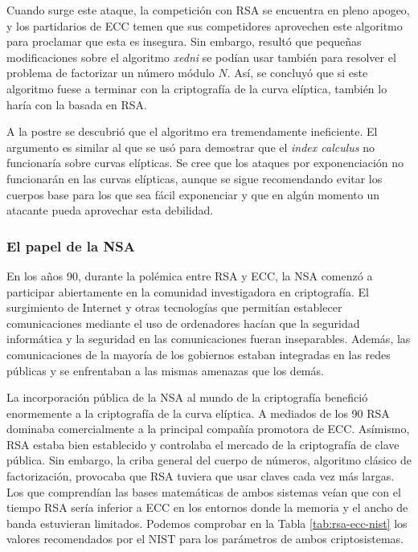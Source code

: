 \documentclass[
  a4paper,
  12pt,
  spanish,
]{scrartcl}
\begin{document}
Cuando surge este ataque, la competición con RSA se encuentra en pleno apogeo, y los partidarios de ECC temen que sus competidores aprovechen este algoritmo para proclamar que esta es insegura. Sin embargo, resultó que pequeñas modificaciones sobre el algoritmo \textit{xedni} se podían usar también para resolver el problema de factorizar un número módulo $N$. Así, se concluyó que si este algoritmo fuese a terminar con la criptografía de la curva elíptica, también lo haría con la basada en RSA.

A la postre se descubrió que el algoritmo era tremendamente ineficiente. El argumento es similar al que se usó para demostrar que el \textit{index calculus} no funcionaría sobre curvas elípticas. Se cree que los ataques por exponenciación no funcionarán en las curvas elípticas, aunque se sigue recomendando evitar los cuerpos base para los que sea fácil exponenciar y que en algún momento un atacante pueda aprovechar esta debilidad.

\subsubsection{El papel de la NSA}
En los años 90, durante la polémica entre RSA y ECC, la NSA comenzó a participar abiertamente en la comunidad investigadora en criptografía. El surgimiento de Internet y otras tecnologías que permitían establecer comunicaciones mediante el uso de ordenadores hacían que la seguridad informática y la seguridad en las comunicaciones fueran inseparables. Además, las comunicaciones de la mayoría de los gobiernos estaban integradas en las redes públicas y se enfrentaban a las mismas amenazas que los demás.

La incorporación pública de la NSA al mundo de la criptografía benefició enormemente a la criptografía de la curva elíptica. A mediados de los 90 RSA dominaba comercialmente a la principal compañía promotora de ECC. Asímismo, RSA estaba bien establecido y controlaba el mercado de la criptografía de clave pública. Sin embargo, la criba general del cuerpo de números, algoritmo clásico de factorización, provocaba que RSA tuviera que usar claves cada vez más largas. Los que comprendían las bases matemáticas de ambos sistemas veían que con el tiempo RSA sería inferior a ECC en los entornos donde la memoria y el ancho de banda estuvieran limitados. Podemos comprobar en la Tabla \ref{tab:rsa-ecc-nist} los valores recomendados por el NIST para los parámetros de ambos criptosistemas.
\end{document}
